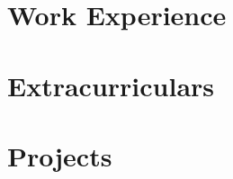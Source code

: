 \documentclass[a4paper,8pt]{article}
\newif\ifATS
\begin{document}
\pagestyle{empty} 

\ATStrue


\ResumeHeader

\SkillsSection
\section{Work Experience}
\Positions
\section{Extracurriculars}
\ExtracurricularWithout

\section{Projects}
\ProjectLists

\EducationSection
\end{document}
